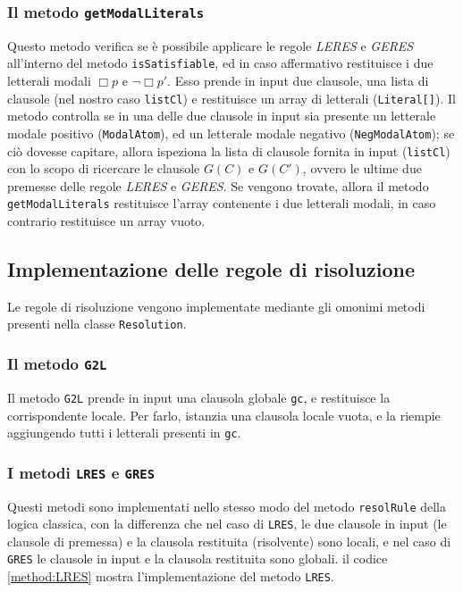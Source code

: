 \documentclass[a4paper,12pt]{report}
\begin{document}
\subsubsection{Il metodo \texttt{getModalLiterals}}
Questo metodo verifica se è possibile applicare le regole \emph{LERES} e \emph{GERES} all'interno del metodo \texttt{isSatisfiable}, ed in caso affermativo restituisce i due letterali modali $\Box p$ e $\lnot \Box p'$. Esso prende in input due clausole, una lista di clausole (nel nostro caso \texttt{listCl}) e restituisce un array di letterali (\texttt{Literal[]}). Il metodo controlla se in una delle due clausole in input sia presente un letterale modale positivo (\texttt{ModalAtom}), ed un letterale modale negativo (\texttt{NegModalAtom}); se ciò dovesse capitare, allora ispeziona la lista di clausole fornita in input (\texttt{listCl}) con lo scopo di ricercare le clausole $G(C)$ e $G(C')$, ovvero le ultime due premesse delle regole \emph{LERES} e \emph{GERES}. Se vengono trovate, allora il metodo \texttt{getModalLiterals} restituisce l'array contenente i due letterali modali, in caso contrario restituisce un array vuoto.

\subsection{Implementazione delle regole di risoluzione}
Le regole di risoluzione vengono implementate mediante gli omonimi metodi presenti nella classe \texttt{Resolution}.

\subsubsection{Il metodo \texttt{G2L}}
Il metodo \texttt{G2L} prende in input una clausola globale \texttt{gc}, e restituisce la corrispondente locale. Per farlo, istanzia una clausola locale vuota, e la riempie aggiungendo tutti i letterali presenti in \texttt{gc}.

\subsubsection{I metodi \texttt{LRES} e \texttt{GRES}}
Questi metodi sono implementati nello stesso modo del metodo \texttt{resolRule} della logica classica, con la differenza che nel caso di \texttt{LRES}, le due clausole in input (le clausole di premessa) e la clausola restituita (risolvente) sono locali, e nel caso di \texttt{GRES} le clausole in input e la clausola restituita sono globali. il codice \ref{method:LRES} mostra l'implementazione del metodo \texttt{LRES}.
\end{document}
